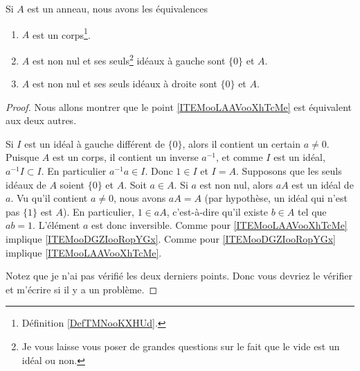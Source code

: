 \begin{proposition}     \label{AnnCorpsIdeal}\label{PROPooUOCVooZGAVVk}
	Si \( A\) est un anneau, nous avons les équivalences
	\begin{enumerate}
		\item       \label{ITEMooLAAVooXhTcMe}
		      \( A\) est un corps\footnote{Définition \ref{DefTMNooKXHUd}.}.
		\item       \label{ITEMooDGZIooRopYGx}
		      \( A\) est non nul et ses seuls\footnote{Je vous laisse vous poser de grandes questions sur le fait que le vide est un idéal ou non.} idéaux à gauche sont \( \{ 0 \}\) et \( A\).
		\item       \label{ITEMooLPWHooDJpTbR}
		      \( A\) est non nul et ses seuls idéaux à droite sont \( \{ 0 \}\) et \( A\).
	\end{enumerate}
\end{proposition}

\begin{proof}
	Nous allons montrer que le point \ref{ITEMooLAAVooXhTcMe} est équivalent aux deux autres.
	\begin{subproof}
		Si \( I\) est un idéal à gauche différent de \( \{ 0 \}\), alors il contient un certain \( a\neq 0\). Puisque \( A\) est un corps, il contient un inverse \( a^{-1}\), et comme \( I\) est un idéal, \( a^{-1} I\subset I\). En particulier \( a^{-1}a\in I\). Donc \( 1\in I\) et \( I=A\).
		Supposons que les seuls idéaux de \( A\) soient \( \{ 0 \}\) et \( A\). Soit \( a\in A\). Si \( a\) est non nul, alors \( aA\) est un idéal de \( a\). Vu qu'il contient \( a\neq 0\), nous avons \( aA=A\) (par hypothèse, un idéal qui n'est pas \( \{ 1 \}\) est \( A\)). En particulier, \( 1\in aA\), c'est-à-dire qu'il existe \( b\in A\) tel que \( ab=1\). L'élément \( a\) est donc inversible.
		Comme pour \ref{ITEMooLAAVooXhTcMe} implique \ref{ITEMooDGZIooRopYGx}.
		Comme pour \ref{ITEMooDGZIooRopYGx} implique \ref{ITEMooLAAVooXhTcMe}.
	\end{subproof}
	Notez que je n'ai pas vérifié les deux derniers points. Donc vous devriez le vérifier et m'écrire si il y a un problème.
\end{proof}

